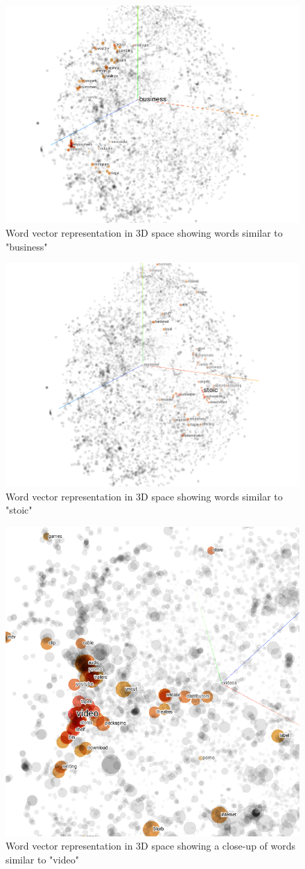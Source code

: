\documentclass[journal]{IEEEtran}
\begin{document}
\begin{figure}[!htb]
\centering
\includegraphics[width=.4\textwidth]{business}
\caption{Word vector representation in 3D space showing words similar to "business"}
\label{fig:business}
\end{figure}

\begin{figure}[!htb]
\centering
\includegraphics[width=.4\textwidth]{stoic}
\caption{Word vector representation in 3D space showing words similar to "stoic"}
\label{fig:stoic}
\end{figure}


\begin{figure}[!htb]
\centering
\includegraphics[width=.42\textwidth]{videocloseup}
\caption{Word vector representation in 3D space showing a close-up of words similar to "video"}
\label{fig:videocloseup}
\end{figure}

\end{document}
